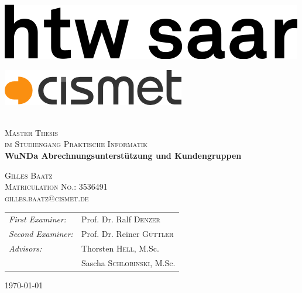\begin{titlepage}
\begin{center}

\begin{minipage}[t]{0.4\textwidth}
	\begin{flushleft}
	\includegraphics[width=\textwidth]{preamble/img/logo_htw_saar}
	\end{flushleft}
\end{minipage}
\hfill
\begin{minipage}[t]{0.4\textwidth}
	\begin{flushright}
	\includegraphics[width=\textwidth]{preamble/img/logo_cismet_grey}
	\end{flushright}
\end{minipage}



~\\[1cm]

\textsc{\LARGE Master Thesis}\\
\textsc{\large im Studiengang Praktische Informatik}\\[1.5cm]
\hspace{0.4cm}
{ \huge \bfseries  WuNDa Abrechnungsunterstützung und Kundengruppen \\[0.4cm] }

\hspace{1.5cm}

\textsc{\large Gilles Baatz}\\[0.2cm]
\textsc{\large Matriculation No.: 3536491}\\[0.2cm]
\textsc{\large gilles.baatz@cismet.de}\\[4cm]

\begin{tabular}[0.8\textwidth]{l l}
\emph{First Examiner:} & Prof. Dr. Ralf \textsc{Denzer} \\
\emph{Second Examiner:} & Prof. Dr. Reiner \textsc{Güttler} \\
\emph{Advisors:} & Thorsten \textsc{Hell}, M.Sc. \\
 				& Sascha \textsc{Schlobinski}, M.Sc.
\end{tabular}


\vfill

{\large \today}

\end{center}
\end{titlepage}